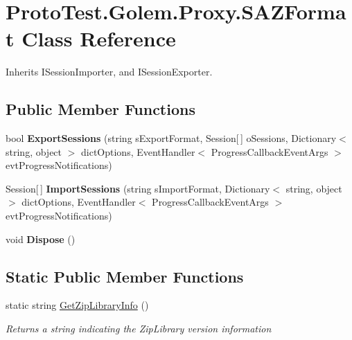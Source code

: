 \hypertarget{class_proto_test_1_1_golem_1_1_proxy_1_1_s_a_z_format}{\section{Proto\-Test.\-Golem.\-Proxy.\-S\-A\-Z\-Format Class Reference}
\label{class_proto_test_1_1_golem_1_1_proxy_1_1_s_a_z_format}
}


Inherits I\-Session\-Importer, and I\-Session\-Exporter.

\subsection*{Public Member Functions}
\begin{DoxyCompactItemize}
\item 
\hypertarget{class_proto_test_1_1_golem_1_1_proxy_1_1_s_a_z_format_a5215fd217a43b12561f70a407ba1e76f}{bool {\bfseries Export\-Sessions} (string s\-Export\-Format, Session\mbox{[}$\,$\mbox{]} o\-Sessions, Dictionary$<$ string, object $>$ dict\-Options, Event\-Handler$<$ Progress\-Callback\-Event\-Args $>$ evt\-Progress\-Notifications)}\label{class_proto_test_1_1_golem_1_1_proxy_1_1_s_a_z_format_a5215fd217a43b12561f70a407ba1e76f}

\item 
\hypertarget{class_proto_test_1_1_golem_1_1_proxy_1_1_s_a_z_format_a9766054de4334784d8a2a023b1883164}{Session\mbox{[}$\,$\mbox{]} {\bfseries Import\-Sessions} (string s\-Import\-Format, Dictionary$<$ string, object $>$ dict\-Options, Event\-Handler$<$ Progress\-Callback\-Event\-Args $>$ evt\-Progress\-Notifications)}\label{class_proto_test_1_1_golem_1_1_proxy_1_1_s_a_z_format_a9766054de4334784d8a2a023b1883164}

\item 
\hypertarget{class_proto_test_1_1_golem_1_1_proxy_1_1_s_a_z_format_a0f3f9c24e78b4864ea610763a5584e76}{void {\bfseries Dispose} ()}\label{class_proto_test_1_1_golem_1_1_proxy_1_1_s_a_z_format_a0f3f9c24e78b4864ea610763a5584e76}

\end{DoxyCompactItemize}
\subsection*{Static Public Member Functions}
\begin{DoxyCompactItemize}
\item 
static string \hyperlink{class_proto_test_1_1_golem_1_1_proxy_1_1_s_a_z_format_a58acc54f7cd12eab680b4fa08b86d0ed}{Get\-Zip\-Library\-Info} ()
\begin{DoxyCompactList}\small\item\em Returns a string indicating the Zip\-Library version information \end{DoxyCompactList}\end{DoxyCompactItemize}


